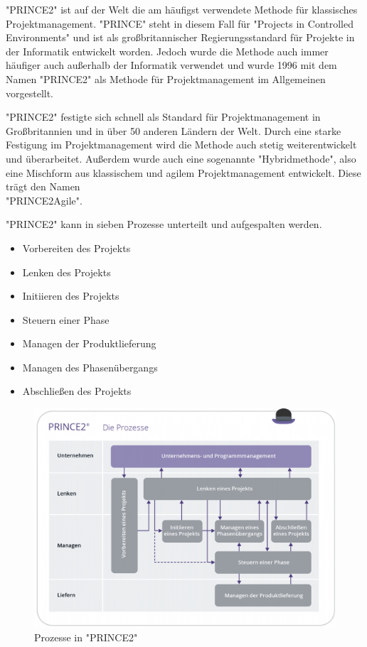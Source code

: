 

"PRINCE2" ist auf der Welt die am häufigst verwendete Methode für klassisches Projektmanagement. "PRINCE" steht in diesem Fall für "Projects in Controlled Environments" und ist als großbritannischer Regierungsstandard für Projekte in der Informatik entwickelt worden. Jedoch wurde die Methode auch immer häufiger auch außerhalb der Informatik verwendet und wurde 1996 mit dem Namen "PRINCE2" als Methode für Projektmanagement im Allgemeinen vorgestellt. \cite{Projectman.}

"PRINCE2" festigte sich schnell als Standard für Projektmanagement in Großbritannien und in über 50 anderen Ländern der Welt. Durch eine starke Festigung im Projektmanagement wird die Methode auch stetig weiterentwickelt und überarbeitet. Außerdem wurde auch eine sogenannte "Hybridmethode", also eine Mischform aus klassischem und agilem Projektmanagement entwickelt. Diese trägt den Namen\\ "PRINCE2Agile". \cite{Projectman.}


"PRINCE2" kann in sieben Prozesse unterteilt und aufgespalten werden.

\begin{itemize}
    \item Vorbereiten des Projekts
    \item Lenken des Projekts
    \item Initiieren des Projekts
    \item Steuern einer Phase
    \item Managen der Produktlieferung
    \item Managen des Phasenübergangs
    \item Abschließen des Projekts
\end{itemize}

\cite{Prince2}

\begin{figure}[H]
    \centering
    \includegraphics[width=\textwidth]{media/ProjectManagement/Prince2.png}
    \caption{Prozesse in "PRINCE2" \cite{Prince2}}
    \label{fig:prince}
\end{figure}

